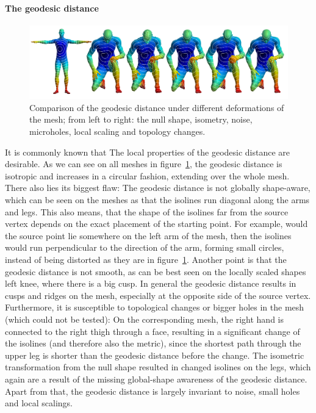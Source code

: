 \paragraph{The geodesic distance}
\begin{figure}[h]
	\centering
	\includegraphics[width = \textwidth]{../results/geodesic_isolines}
	\caption{Comparison of the geodesic distance under different deformations of the mesh; from left to right: the null shape, isometry, noise, microholes, local scaling and topology changes.}
	\label{fig:geo_isolines}
\end{figure}
It is commonly known that The local properties of the geodesic distance are desirable.
As we can see on all meshes in figure~\ref{fig:geo_isolines}, the geodesic distance is isotropic and increases in a circular fashion, extending over the whole mesh.
There also lies its biggest flaw:
The geodesic distance is not globally shape-aware, which can be seen on the meshes as that the isolines run diagonal along the arms and legs.
This also means, that the shape of the isolines far from the source vertex depends on the exact placement of the starting point.
For example, would the source point lie somewhere on the left arm of the mesh, then the isolines would run perpendicular to the direction of the arm, forming small circles, instead of being distorted as they are in figure~\ref{fig:geo_isolines}.
Another point is that the geodesic distance is not smooth, as can be best seen on the locally scaled shapes left knee, where there is a big cusp.
In general the geodesic distance results in cusps and ridges on the mesh, especially at the opposite side of the source vertex.
Furthermore, it is susceptible to topological changes or bigger holes in the mesh (which could not be tested):
On the corresponding mesh, the right hand is connected to the right thigh through a face, resulting in a significant change of the isolines (and therefore also the metric), since the shortest path through the upper leg is shorter than the geodesic distance before the change.
The isometric transformation from the null shape resulted in changed isolines on the legs, which again are a result of the missing global-shape awareness of the geodesic distance.
Apart from that, the geodesic distance is largely invariant to noise, small holes and local scalings.

